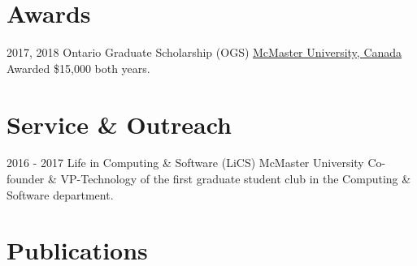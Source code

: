 \documentclass[letterpaper]{twentysecondcv} %
\begin{document}
\section{Awards}

\vspace{-.5em}
\begin{twenty}
  \twentyitem
  {2017,}
  {2018}
  {Ontario Graduate Scholarship (OGS)}
	{\href{https://www.mcmaster.ca/}{McMaster University, Canada}}
	{}
	{Awarded \$15,000 both years.}
\end{twenty}

\vspace{-.5em}
\section{Service \& Outreach}
\vspace{-.5em}
\begin{twenty}
	\twentyitem
	{2016 -}
	{2017}
	{Life in Computing \& Software (LiCS)}
	{McMaster University}
	{}
	{Co-founder \& VP-Technology of the first graduate student club in the Computing \& Software department.}
\end{twenty}

\vspace{-.5em}
\section{Publications}
\vspace{-.5em}
\printbibliography[heading=none]
\end{document}
